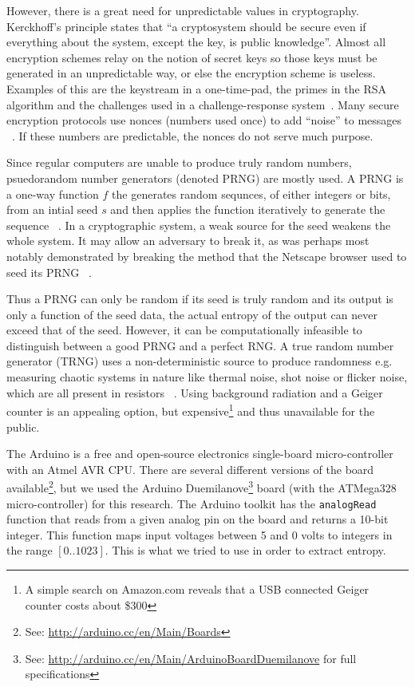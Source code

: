 \documentclass[a4paper]{article}           %
\begin{document}
However, there is a great need for unpredictable values in cryptography. Kerckhoff's principle states that ``a cryptosystem should be secure even if everything about the system, except the key, is public knowledge''. Almost all encryption schemes relay on the notion of secret keys so those keys must be generated in an unpredictable way, or else the encryption scheme is useless. Examples of this are the keystream in a one-time-pad, the primes in the RSA algorithm and the challenges used in a challenge-response system~\cite{menezes1996,anthes2011}. Many secure encryption protocols use nonces (numbers used once) to add ``noise'' to messages ~\cite{anthes2011}. If these numbers are predictable, the nonces do not serve much purpose. 



Since regular computers are unable to produce truly random numbers, psuedorandom number generators (denoted PRNG) are mostly used. A PRNG is a one-way function $f$ the generates random sequnces, of either integers or bits, from an intial seed $s$ and then applies the function iteratively to generate the sequence ~\cite{menezes1996}. In a cryptographic system, a weak source for the seed weakens the whole system. It may allow an adversary to break it, as was perhaps most notably demonstrated by breaking the method that the Netscape browser used to seed its PRNG ~\cite{netscape}. 

Thus a PRNG can only be random if its seed is truly random and its output is only a function of the seed data, the actual entropy of the output can never exceed that of the seed. However, it can be computationally infeasible to distinguish between a good PRNG and a perfect RNG. A true random number generator (TRNG) uses a non-deterministic source to produce randomness e.g. measuring chaotic systems in nature like thermal noise, shot noise or flicker noise, which are all present in resistors ~\cite{intel}. Using background radiation and a Geiger counter is an appealing option, but expensive\footnote{A simple search on Amazon.com reveals that a USB connected Geiger counter costs about \$300} and thus unavailable for the public. 

The Arduino is a free and open-source electronics single-board micro-controller with an Atmel AVR CPU. There are several different versions of the board available\footnote{See: \url{http://arduino.cc/en/Main/Boards}}, but we used the Arduino Duemilanove\footnote{See: \url{http://arduino.cc/en/Main/ArduinoBoardDuemilanove} for full specifications} board (with the ATMega328 ~\cite{atmegads} micro-controller) for this research. The Arduino toolkit has the \texttt{analogRead} function that reads from a given analog pin on the board and returns a 10-bit integer. This function maps input voltages between 5 and 0 volts to integers in the range $[0..1023]$. This is what we tried to use in order to extract entropy.
\end{document}
